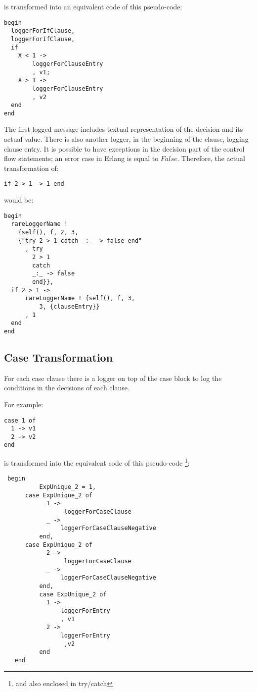 \documentclass[12pt,a4paper]{report}
\begin{document}
is transformed into an equivalent code of this pseudo-code:

\begin{lstlisting}
begin
  loggerForIfClause,
  loggerForIfClause,  
  if 
    X < 1 ->
	    loggerForClauseEntry
	    , v1;
    X > 1 ->
	    loggerForClauseEntry
	    , v2
  end
end 
\end{lstlisting}

The first logged message includes textual representation of the decision and its actual value. There is also another logger, in the beginning of the clause, logging clause entry. It is possible to have exceptions in the decision part of the control flow statements; an error case in Erlang is equal to $False$. Therefore, the actual transformation of:

\begin{lstlisting}
if 2 > 1 -> 1 end
\end{lstlisting}

would be:

\begin{lstlisting}
begin
  rareLoggerName !
    {self(), f, 2, 3,
	{"try 2 > 1 catch _:_ -> false end"
	  , try 	
		2 > 1 
	    catch 
		_:_ -> false 
	    end}},
  if 2 > 1 ->
      rareLoggerName ! {self(), f, 3,
	      3, {clauseEntry}}
      , 1
  end
end 
\end{lstlisting}

\subsection{Case Transformation}
For each case clause there is a logger on top of the case block to log the conditions in the decisions of each clause.
 
For example:
\begin{lstlisting}
case 1 of 
  1 -> v1
  2 -> v2
end 
\end{lstlisting}

is transformed into the equivalent code of this pseudo-code \footnote{and also enclosed in try/catch}:
\begin{lstlisting}
 begin
          ExpUnique_2 = 1,
	  case ExpUnique_2 of
            1 ->
                 loggerForCaseClause
            _ ->
                loggerForCaseClauseNegative
          end,
	  case ExpUnique_2 of
            2 ->
                 loggerForCaseClause
            _ ->
                loggerForCaseClauseNegative
          end,
          case ExpUnique_2 of
            1 ->
                loggerForEntry
                , v1
            2 ->
                loggerForEntry
                 ,v2  
          end
   end
\end{lstlisting}  
\end{document}
